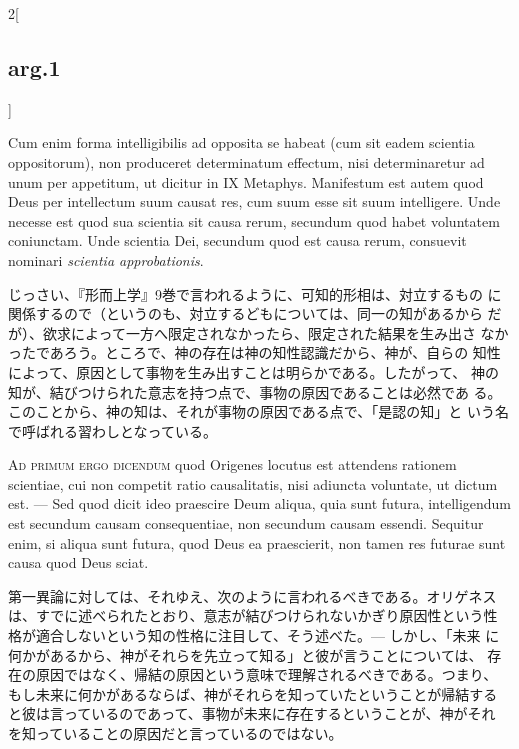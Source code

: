 \documentclass[paper=a4paper,fontsize=10pt,jafontsize=9pt,titlepage]{jlreq}
\begin{document}
\begin{paracol}{2}[\subsection{arg.1}]
\switchcolumn*

Cum enim forma intelligibilis ad opposita se habeat (cum sit eadem
scientia oppositorum), non produceret determinatum effectum, nisi
determinaretur ad unum per appetitum, ut dicitur in IX
Metaphys. Manifestum est autem quod Deus per intellectum suum causat
res, cum suum esse sit suum intelligere. Unde necesse est quod sua
scientia sit causa rerum, secundum quod habet voluntatem
coniunctam. Unde scientia Dei, secundum quod est causa rerum,
consuevit nominari {\itshape scientia approbationis}.

\switchcolumn

じっさい、『形而上学』9巻で言われるように、可知的形相は、対立するもの
に関係するので（というのも、対立するどもについては、同一の知があるから
だが）、欲求によって一方へ限定されなかったら、限定された結果を生み出さ
なかったであろう。ところで、神の存在は神の知性認識だから、神が、自らの
知性によって、原因として事物を生み出すことは明らかである。したがって、
神の知が、結びつけられた意志を持つ点で、事物の原因であることは必然であ
る。このことから、神の知は、それが事物の原因である点で、「是認の知」と
いう名で呼ばれる習わしとなっている。

\switchcolumn*[\subsection{ad.1}]

{\scshape Ad primum ergo dicendum} quod Origenes locutus est attendens
rationem scientiae, cui non competit ratio causalitatis, nisi adiuncta
voluntate, ut dictum est. --- Sed quod dicit ideo praescire Deum
aliqua, quia sunt futura, intelligendum est secundum causam
consequentiae, non secundum causam essendi. Sequitur enim, si aliqua
sunt futura, quod Deus ea praescierit, non tamen res futurae sunt
causa quod Deus sciat.

\switchcolumn

第一異論に対しては、それゆえ、次のように言われるべきである。オリゲネス
は、すでに述べられたとおり、意志が結びつけられないかぎり原因性という性
格が適合しないという知の性格に注目して、そう述べた。--- しかし、「未来
に何かがあるから、神がそれらを先立って知る」と彼が言うことについては、
存在の原因ではなく、帰結の原因という意味で理解されるべきである。つまり、
もし未来に何かがあるならば、神がそれらを知っていたということが帰結する
と彼は言っているのであって、事物が未来に存在するということが、神がそれ
を知っていることの原因だと言っているのではない。

\switchcolumn*[\subsection{ad.2}]


\end{paracol}
\end{document}
